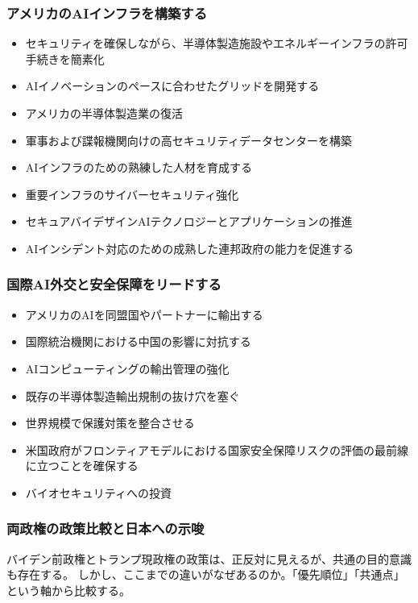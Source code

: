\subsubsection*{アメリカのAIインフラを構築する}

\begin{itemize}
    \item セキュリティを確保しながら、半導体製造施設やエネルギーインフラの許可手続きを簡素化
    \item AIイノベーションのペースに合わせたグリッドを開発する
    \item アメリカの半導体製造業の復活
    \item 軍事および諜報機関向けの高セキュリティデータセンターを構築
    \item AIインフラのための熟練した人材を育成する
    \item 重要インフラのサイバーセキュリティ強化  
    \item セキュアバイデザインAIテクノロジーとアプリケーションの推進
    \item AIインシデント対応のための成熟した連邦政府の能力を促進する
\end{itemize}

\subsubsection*{国際AI外交と安全保障をリードする}

\begin{itemize}
    \item アメリカのAIを同盟国やパートナーに輸出する
    \item 国際統治機関における中国の影響に対抗する
    \item AIコンピューティングの輸出管理の強化
    \item 既存の半導体製造輸出規制の抜け穴を塞ぐ
    \item 世界規模で保護対策を整合させる
    \item 米国政府がフロンティアモデルにおける国家安全保障リスクの評価の最前線に立つことを確保する
    \item バイオセキュリティへの投資
\end{itemize}

\subsubsection{両政権の政策比較と日本への示唆}

バイデン前政権とトランプ現政権の政策は、正反対に見えるが、共通の目的意識も存在する。
しかし、ここまでの違いがなぜあるのか。「優先順位」「共通点」という軸から比較する。

